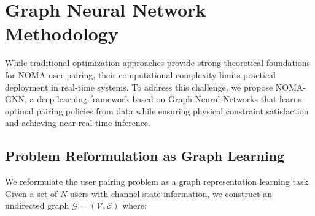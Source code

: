 \documentclass[conference]{IEEEtran}
\begin{document}


\section{Graph Neural Network Methodology}
While traditional optimization approaches provide strong theoretical foundations for NOMA user pairing, their computational complexity limits practical deployment in real-time systems. To address this challenge, we propose NOMA-GNN, a deep learning framework based on Graph Neural Networks that learns optimal pairing policies from data while ensuring physical constraint satisfaction and achieving near-real-time inference.
\subsection{Problem Reformulation as Graph Learning}

We reformulate the user pairing problem as a graph representation learning task. Given a set of $N$ users with channel state information, we construct an undirected graph $\mathcal{G} = (\mathcal{V}, \mathcal{E})$ where:
\end{document}
